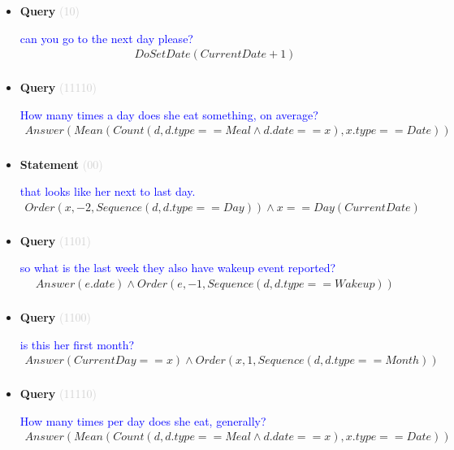 \documentclass[11pt]{article}
\newcommand{\key}[1]{\textcolor{lightgray}{#1}}
\newcounter{CQuery}
\newcounter{CStatement}
\begin{document}
\begin{itemize}
\item
\textbf{Query\theCQuery} \key{(10)} \addtocounter{CQuery}{1}
\textcolor{blue}{ can you go to the next day please? }
\begin{multline*}
DoSetDate(CurrentDate + 1) \\ 
\end{multline*}


\item
\textbf{Query\theCQuery} \key{(11110)} \addtocounter{CQuery}{1}
\textcolor{blue}{ How many times a day does she eat something, on average? }
\begin{multline*}
Answer(Mean(Count(d, d.type==Meal \wedge d.date==x), x.type==Date)) \\ 
\end{multline*}


\item
\textbf{Statement\theCStatement} \key{(00)} \addtocounter{CStatement}{1}
\textcolor{blue}{ that looks like her next to last day. }
\begin{multline*}
Order(x, -2, Sequence(d, d.type==Day)) \wedge x==Day(CurrentDate) \\ 
\end{multline*}


\item
\textbf{Query\theCQuery} \key{(1101)} \addtocounter{CQuery}{1}
\textcolor{blue}{ so what is the last week they also have wakeup event reported? }
\begin{multline*}
Answer(e.date) \wedge Order(e, -1, Sequence(d, d.type==Wakeup)) \\ 
\end{multline*}


\item
\textbf{Query\theCQuery} \key{(1100)} \addtocounter{CQuery}{1}
\textcolor{blue}{ is this her first month? }
\begin{multline*}
Answer(CurrentDay==x) \wedge Order(x, 1, Sequence(d, d.type==Month)) \\ 
\end{multline*}


\item
\textbf{Query\theCQuery} \key{(11110)} \addtocounter{CQuery}{1}
\textcolor{blue}{ How many times per day does she eat, generally? }
\begin{multline*}
Answer(Mean(Count(d, d.type==Meal \wedge d.date==x), x.type==Date)) \\ 
\end{multline*}



\end{itemize}
\end{document}
